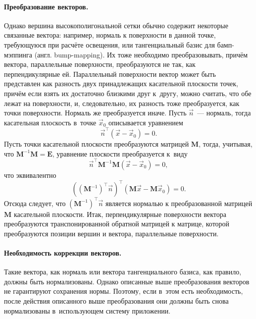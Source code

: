\documentclass[a4paper, 14pt, titlepage]{extarticle}
\newcommand{\eng}[1]{{\English #1}}
\newcommand{\vect}[1]{\vec{#1}} %
\newcommand{\matx}[1]{\mathbf{#1}} %
\newcommand{\transposed}{\top} %
\begin{document}
        \paragraph{Преобразование векторов.}
        Однако вершина высокополигональной сетки обычно содержит некоторые связанные вектора:
        например, нормаль к поверхности в данной точке, требующуюся при расчёте освещения, или
        тангенциальный базис для бамп-мэппинга (англ. \eng{bump-mapping}). Их тоже необходимо
        преобразовывать, причём вектора, параллельные поверхности, преобразуются не так, как
        перпендикулярные ей. Параллельный поверхности вектор может быть представлен как разность двух
        принадлежащих касательной плоскости точек, причём если взять их достаточно близкими друг
        к~другу, можно считать, что обе лежат на поверхности, и, следовательно, их разность тоже
        преобразуется, как точки поверхности. Нормаль же преобразуется иначе. Пусть $\vect n$~---
        нормаль, тогда касательная плоскость в~точке $\vect{x}_0$ описывается уравнением
        \[
        \vect{n}^\transposed (\vect x - \vect{x}_0) = 0.
        \]
        Пусть точки касательной плоскости преобразуются матрицей $\matx M$, тогда, учитывая, что
        $\matx{M}^{-1} \matx{M} = \matx{E}$, уравнение плоскости преобразуется к~виду
        \[
          \vect{n}^\transposed \matx{M}^{-1} \matx{M} (\vect x - \vect{x}_0) = 0,
        \]
        что эквивалентно
        \[
           \left( (\matx{M}^{-1})^\transposed \vect{n} \right)^\transposed (\matx{M} \vect x - \matx{M} \vect{x}_0) = 0.
        \]
        Отсюда следует, что $(\matx{M}^{-1})^\transposed \vect{n}$ является нормалью к преобразованной
        матрицей $\matx M$ касательной плоскости. Итак, перпендикулярные поверхности вектора
        преобразуются транспонированной обратной матрицей к матрице, которой преобразуются позиции
        вершин и вектора, параллельные поверхности.

        \paragraph{Необходимость коррекции векторов.}
        Такие вектора, как нормаль или вектора тангенциального базиса, как правило, должны быть
        нормализованы. Однако описанные выше преобразования векторов не гарантируют сохранения
        нормы. Поэтому, если в~этом есть необходимость, после действия описанного выше преобразования
        они должны быть снова нормализованы в~использующем систему приложении.
\end{document}
